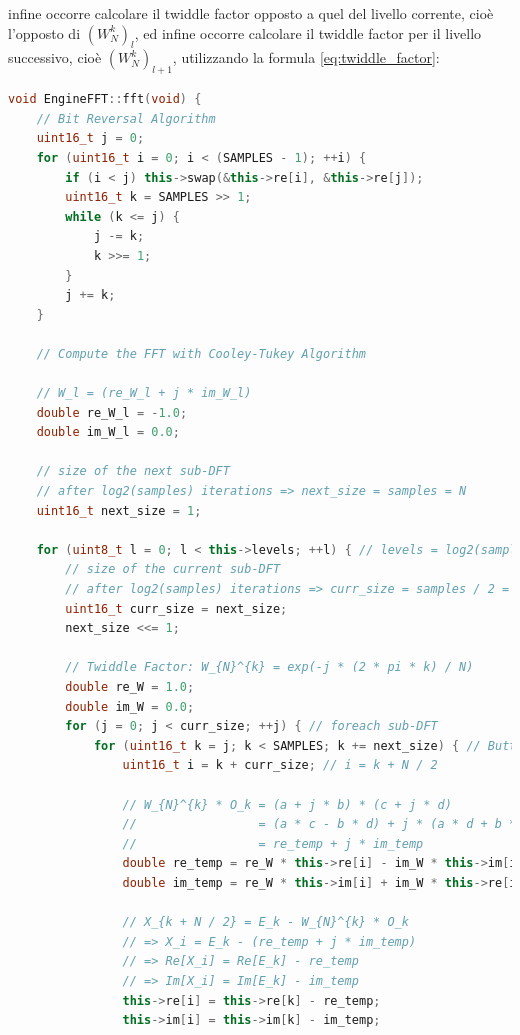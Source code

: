 \documentclass[a4paper,12pt]{report}  %
\begin{document}
infine occorre calcolare il twiddle factor opposto a quel del livello corrente, cioè l'opposto di $\left ( W_N^{k} \right )_l$, ed infine occorre calcolare il twiddle factor per il livello successivo, cioè $\left ( W_N^{k} \right )_{l + 1}$, utilizzando la formula \eqref{eq:twiddle_factor}:

\begin{lstlisting}[language=C++, keywords={void, sqrt, uint16_t, while, for, if, double, this, uint8_t}]
void EngineFFT::fft(void) {
    // Bit Reversal Algorithm
    uint16_t j = 0;
    for (uint16_t i = 0; i < (SAMPLES - 1); ++i) {
        if (i < j) this->swap(&this->re[i], &this->re[j]);
        uint16_t k = SAMPLES >> 1;
        while (k <= j) {
            j -= k;
            k >>= 1;
        }
        j += k;
    }
    
    // Compute the FFT with Cooley-Tukey Algorithm
    
    // W_l = (re_W_l + j * im_W_l)
    double re_W_l = -1.0;
    double im_W_l = 0.0;
    
    // size of the next sub-DFT
    // after log2(samples) iterations => next_size = samples = N
    uint16_t next_size = 1;
    
    for (uint8_t l = 0; l < this->levels; ++l) { // levels = log2(samples)
        // size of the current sub-DFT
        // after log2(samples) iterations => curr_size = samples / 2 = N / 2
        uint16_t curr_size = next_size;
        next_size <<= 1;
    
        // Twiddle Factor: W_{N}^{k} = exp(-j * (2 * pi * k) / N)
        double re_W = 1.0;
        double im_W = 0.0;
        for (j = 0; j < curr_size; ++j) { // foreach sub-DFT
            for (uint16_t k = j; k < SAMPLES; k += next_size) { // Butterfly Operations
                uint16_t i = k + curr_size; // i = k + N / 2
        
                // W_{N}^{k} * O_k = (a + j * b) * (c + j * d)
                //                 = (a * c - b * d) + j * (a * d + b * c)
                //                 = re_temp + j * im_temp
                double re_temp = re_W * this->re[i] - im_W * this->im[i];
                double im_temp = re_W * this->im[i] + im_W * this->re[i];
                
                // X_{k + N / 2} = E_k - W_{N}^{k} * O_k
                // => X_i = E_k - (re_temp + j * im_temp)
                // => Re[X_i] = Re[E_k] - re_temp
                // => Im[X_i] = Im[E_k] - im_temp
                this->re[i] = this->re[k] - re_temp;
                this->im[i] = this->im[k] - im_temp;
                

\end{lstlisting}
\end{document}
